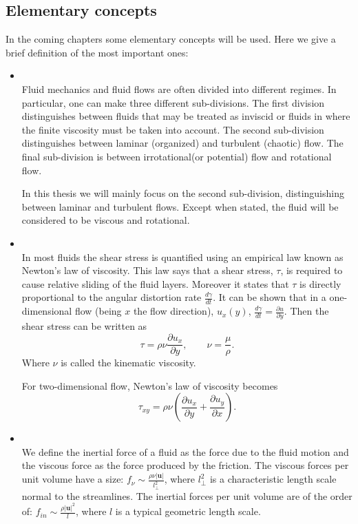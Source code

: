 \subsection{Elementary concepts}
In the coming chapters some elementary concepts will be used. Here we give a brief definition of the most important ones:
\begin{itemize}
\item{}\\Fluid mechanics and fluid flows are often divided into different regimes. In particular, one can make three different sub-divisions. The first division distinguishes between fluids that may be treated as inviscid or fluids in where the finite viscosity must be taken into account. The second sub-division distinguishes between laminar (organized) and turbulent (chaotic) flow. The final sub-division is between irrotational(or potential) flow and rotational flow.

In this thesis we will mainly focus on the second sub-division, distinguishing between laminar and turbulent flows. Except when stated, the fluid will be considered to be viscous and rotational.

\item{}\\In most fluids the shear stress is quantified using an empirical law known as Newton's law of viscosity. This law says that a shear stress, $\tau$, is required to cause relative sliding of the fluid layers. Moreover it states that $\tau$ is directly proportional to the angular distortion rate $\frac{d\gamma}{dt}$. It can be shown that in a one-dimensional flow (being $x$ the flow direction), $ u_x(y) $, $ \frac{d\gamma}{dt}=\frac{\partial u}{\partial y} $. Then the shear stress can be written as
$$\tau=\rho\nu\frac{\partial u_x}{\partial y},\quad\quad\nu=\frac{\mu}{\rho}.$$
Where $ \nu $ is called the kinematic viscosity.

For two-dimensional flow, Newton's law of viscosity becomes
$$ \tau_{xy}=\rho\nu\left(\frac{\partial u_x}{\partial y}+\frac{\partial u_y}{\partial x}\right). $$


\item{}\\We define the inertial force of a fluid as the force due to the fluid motion and the viscous force as the force produced by the friction. The viscous forces per unit volume have a size: $ f_\nu\sim\frac{\rho\nu|\mathbf{u}|}{l_\bot^2} $, where $ l_\bot^2 $ is a characteristic length scale normal to the streamlines. The inertial forces per unit volume are of the order of: $ f_{in}\sim\frac{\rho |\mathbf{u}|^2}{l} $, where $ l $ is a typical geometric length scale. 


\end{itemize}
